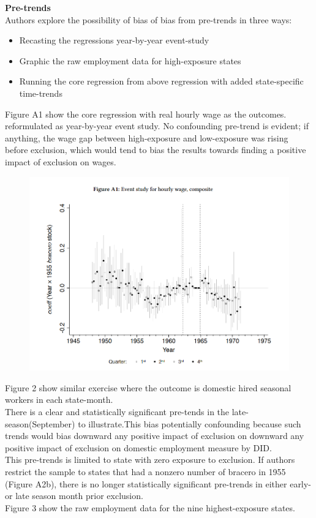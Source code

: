 \documentclass[../root]{subfiles}
\begin{document}
     {\bf Pre-trends} \\
    Authors explore the possibility of bias of bias from pre-trends in three ways:  
    \begin{itemize}
        \item Recasting the regressions year-by-year event-study
        \item Graphic the raw employment data for high-exposure states
        \item Running the core regression from above regression with added state-specific time-trends
    \end{itemize}
    Figure A1 show the core regression with real hourly wage as the outcomes. reformulated as year-by-year event study. No confounding pre-trend is evident; if anything, the wage gap between high-exposure and low-exposure was rising before exclusion, which would tend to bias the results towards finding a positive impact of exclusion on wages.    
    \begin{figure}
        \centering
        \includegraphics[width = \linewidth]{0731sugiyama/FigureA1.png}
        \label{fig:my_label}
    \end{figure}
    
    Figure 2 show similar exercise where the outcome is domestic hired seasonal workers in each state-month. \\
    There is a clear and statistically significant pre-tends in the late-season(September) to illustrate.This bias potentially confounding because such trends would bias downward any positive impact of exclusion on downward any positive impact of exclusion on domestic employment measure by DID. \\
    This pre-trends is limited to state with zero exposure to exclusion. If authors restrict the sample to states that had a nonzero number of bracero in 1955 (Figure A2b), there is no longer statistically significant pre-trends in either early- or late season month prior exclusion. \\
    Figure 3 show the raw employment data for the nine highest-exposure states.
    
\end{document}
